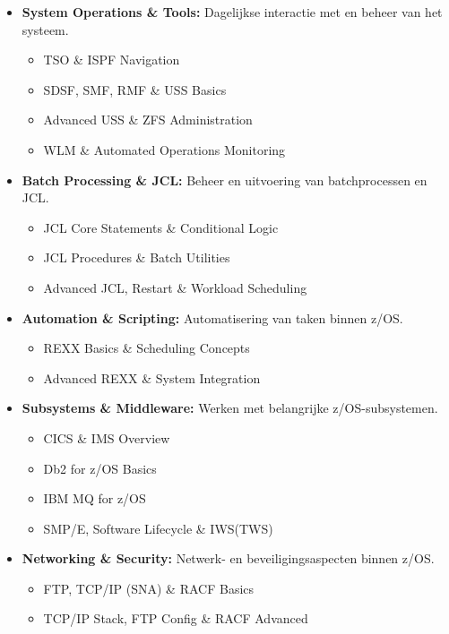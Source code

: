 \begin{itemize}
	\item \textbf{System Operations \& Tools:} Dagelijkse interactie met en beheer van het systeem.
	\begin{itemize}
		\item TSO \& ISPF Navigation
		\item SDSF, SMF, RMF \& USS Basics
		\item Advanced USS \& ZFS Administration
		\item WLM \& Automated Operations Monitoring
	\end{itemize}
	
	\item \textbf{Batch Processing \& JCL:} Beheer en uitvoering van batchprocessen en JCL.
	\begin{itemize}
		\item JCL Core Statements \& Conditional Logic
		\item JCL Procedures \& Batch Utilities
		\item Advanced JCL, Restart \& Workload Scheduling
	\end{itemize}
	
	\item \textbf{Automation \& Scripting:} Automatisering van taken binnen z/OS.
	\begin{itemize}
		\item REXX Basics \& Scheduling Concepts
		\item Advanced REXX \& System Integration
	\end{itemize}
	
	\item \textbf{Subsystems \& Middleware:} Werken met belangrijke z/OS-subsystemen.
	\begin{itemize}
		\item CICS \& IMS Overview
		\item Db2 for z/OS Basics
		\item IBM MQ for z/OS
		\item SMP/E, Software Lifecycle \& IWS(TWS)
	\end{itemize}
	
	\item \textbf{Networking \& Security:} Netwerk- en beveiligingsaspecten binnen z/OS.
	\begin{itemize}
		\item FTP, TCP/IP (SNA) \& RACF Basics
		\item TCP/IP Stack, FTP Config \& RACF Advanced
	\end{itemize}
	
\end{itemize}

